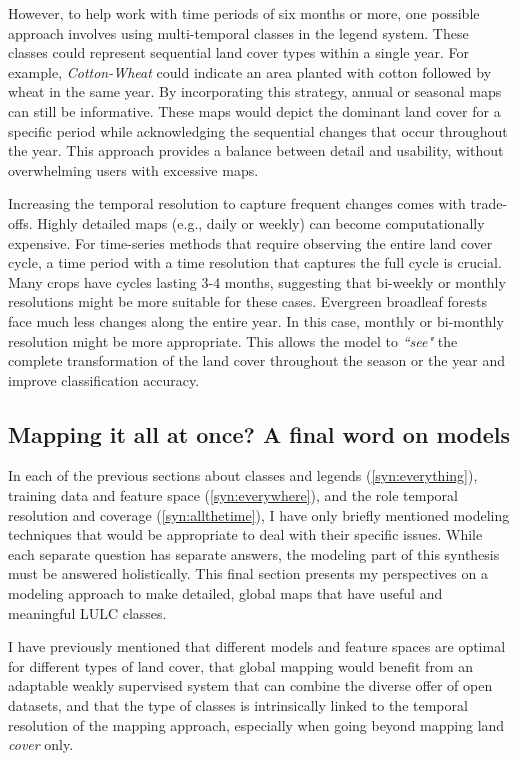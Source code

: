         However, to help work with time periods of six months or more, one possible approach involves using multi-temporal classes in the legend system. These classes could represent sequential land cover types within a single year. For example, \emph{Cotton-Wheat} could indicate an area planted with cotton followed by wheat in the same year. By incorporating this strategy, annual or seasonal maps can still be informative. These maps would depict the dominant land cover for a specific period while acknowledging the sequential changes that occur throughout the year. This approach provides a balance between detail and usability, without overwhelming users with excessive maps.
                
        Increasing the temporal resolution to capture frequent changes comes with trade-offs. Highly detailed maps (e.g., daily or weekly) can become computationally expensive. For time-series methods that require observing the entire land cover cycle, a time period with a time resolution that captures the full cycle is crucial. Many crops have cycles lasting 3-4 months, suggesting that bi-weekly or monthly resolutions might be more suitable for these cases. Evergreen broadleaf forests face much less changes along the entire year. In this case, monthly or bi-monthly resolution might be more appropriate. This allows the model to \textit{``see"} the complete transformation of the land cover throughout the season or the year and improve classification accuracy. 

    \subsection{Mapping it all at once? A final word on models}

        In each of the previous sections about classes and legends (\ref{syn:everything}), training data and feature space (\ref{syn:everywhere}), and the role temporal resolution and coverage (\ref{syn:allthetime}), I have only briefly mentioned modeling techniques that would be appropriate to deal with their specific issues. While each separate question has separate answers, the modeling part of this synthesis must be answered holistically. This final section presents my perspectives on a modeling approach to make detailed, global maps that have useful and meaningful LULC classes. 
        
        I have previously mentioned that different models and feature spaces are optimal for different types of land cover, that global mapping would benefit from an adaptable weakly supervised system that can combine the diverse offer of open datasets, and that the type of classes is intrinsically linked to the temporal resolution of the mapping approach, especially when going beyond mapping land \textit{cover} only.


